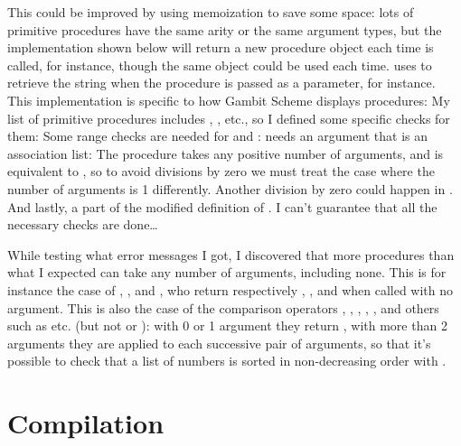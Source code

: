 \begin{exe}[5.30]
\begin{enumerate}
	    This could be improved by using memoization to save some space: lots 
	    of primitive procedures have the same arity or the same argument 
	    types, but the implementation shown below will return a new 
	    procedure object each time  is called, for instance, 
	    though the same object could be used each time.
	     uses  to retrieve the string 
	     when the  procedure is passed as 
	    a parameter, for instance. This implementation is specific to how 
	    Gambit Scheme displays procedures:
	    My list of primitive procedures includes , , 
	    etc., so I defined some specific checks for them:
	    Some range checks are needed for  and 
	    :
	     needs an argument that is an association list:
	    The \vscm{/} procedure takes any positive number of arguments, and 
	     is equivalent to , so to avoid divisions 
	    by zero we must treat the case where the number of arguments is 
	    1 differently. Another division by zero could happen in 
	    .
	    And lastly, a part of the modified definition of 
	    . I can’t guarantee that all the 
	    necessary checks are done…

	    While testing what error messages I got, I discovered that more 
	    procedures than what I expected can take any number of arguments, 
	    including none. This is for instance the case of , 
	    , \vscm{+} and \vscm{*}, who return respectively 
	    \vscm{()}, \vscm{()},  and  when called with no 
	    argument. This is also the case of the comparison operators 
	    \vscm{=}, \vscm{<}, \vscm{>}, \vscm{<=}, \vscm{>=}, and others such 
	    as  etc. (but not  or ): with 
	    0 or 1 argument they return , with more than 2 arguments 
	    they are applied to each successive pair of arguments, so that it’s 
	    possible to check that a list of numbers is sorted in non-decreasing 
	    order with
	    .
    \end{enumerate}
\end{exe}

\section{Compilation}

